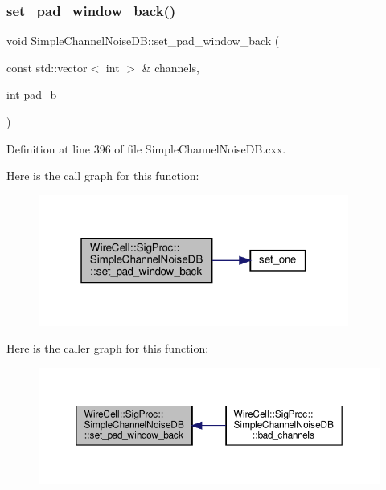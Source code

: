 \subsubsection{\texorpdfstring{set\+\_\+pad\+\_\+window\+\_\+back()}{set\_pad\_window\_back()}}
{\footnotesize\ttfamily void Simple\+Channel\+Noise\+D\+B\+::set\+\_\+pad\+\_\+window\+\_\+back (\begin{DoxyParamCaption}\item[{const std\+::vector$<$ int $>$ \&}]{channels,  }\item[{int}]{pad\+\_\+b }\end{DoxyParamCaption})}



Definition at line 396 of file Simple\+Channel\+Noise\+D\+B.\+cxx.

Here is the call graph for this function\+:
\nopagebreak
\begin{figure}[H]
\begin{center}
\leavevmode
\includegraphics[width=289pt]{class_wire_cell_1_1_sig_proc_1_1_simple_channel_noise_d_b_a08eb429fdab1899edfe52bf8593ba56e_cgraph}
\end{center}
\end{figure}
Here is the caller graph for this function\+:
\nopagebreak
\begin{figure}[H]
\begin{center}
\leavevmode
\includegraphics[width=350pt]{class_wire_cell_1_1_sig_proc_1_1_simple_channel_noise_d_b_a08eb429fdab1899edfe52bf8593ba56e_icgraph}
\end{center}
\end{figure}
\mbox{\label{class_wire_cell_1_1_sig_proc_1_1_simple_channel_noise_d_b_aeb80b3766efb4756055bbe016cd58e2c}} 
